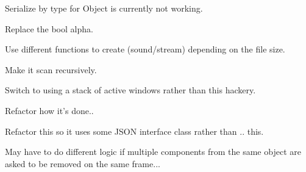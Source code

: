 \begin{DoxyRefList}
\item[\label{todo__todo000007}%
\hypertarget{todo__todo000007}{}%
Member \hyperlink{classDCEngine_1_1Object_a77d4c41334c102e53196d3a6d7cf7215}{D\-C\-Engine\-:\-:Object\-:\-:Serialize} (Zilch\-::\-Json\-Builder \&builder)]Serialize by type for Object is currently not working.  
\item[\label{todo__todo000011}%
\hypertarget{todo__todo000011}{}%
Member \hyperlink{classDCEngine_1_1SpriteSource_ab6e4b6ab4e014b9fe0b5c7e29a4297d1}{D\-C\-Engine\-:\-:Sprite\-Source\-:\-:Load\-Texture} ()]Replace the bool alpha.  
\item[\label{todo__todo000015}%
\hypertarget{todo__todo000015}{}%
Member \hyperlink{classDCEngine_1_1Systems_1_1Audio_a91b9a87f44307937d5f7a597456e1e96}{D\-C\-Engine\-:\-:Systems\-:\-:Audio\-:\-:Create\-Sound} (std\-::string \&sound\-File, F\-M\-O\-D\-Sound\-Handle \&sound\-Ptr)]Use different functions to create (sound/stream) depending on the file size.  
\item[\label{todo__todo000018}%
\hypertarget{todo__todo000018}{}%
Member \hyperlink{classDCEngine_1_1Systems_1_1Content_a12d79aa3afbd0ee1d48bcc885de355b7}{D\-C\-Engine\-:\-:Systems\-:\-:Content\-:\-:Scan\-And\-Generate\-Resources} ()]Make it scan recursively.  
\item[\label{todo__todo000019}%
\hypertarget{todo__todo000019}{}%
Member \hyperlink{classDCEngine_1_1Systems_1_1Editor_a4d530af60faddb7e243bcdd21e58d973}{D\-C\-Engine\-:\-:Systems\-:\-:Editor\-:\-:Toggle\-Test} ()]Switch to using a stack of active windows rather than this hackery.  
\item[\label{todo__todo000035}%
\hypertarget{todo__todo000035}{}%
Member \hyperlink{classDCEngine_1_1Systems_1_1Factory_af6ded32c3d92e2cfa32dc7511df268da}{D\-C\-Engine\-:\-:Systems\-:\-:Factory\-:\-:Build\-Game\-Object} (Serialized\-Member $\ast$object\-Data, Space \&space)]Refactor how it's done..  
\item[\label{todo__todo000034}%
\hypertarget{todo__todo000034}{}%
Member \hyperlink{classDCEngine_1_1Systems_1_1Factory_a3cc34e680424f1982f719da99282765b}{D\-C\-Engine\-:\-:Systems\-:\-:Factory\-:\-:Create\-Game\-Object} (Archetype\-Ptr archetype, Space \&space, bool init)]Refactor this so it uses some J\-S\-O\-N interface class rather than .. this.  
\item[\label{todo__todo000036}%
\hypertarget{todo__todo000036}{}%
Member \hyperlink{classDCEngine_1_1Systems_1_1Factory_a776cd6cdc54459b710a07d16acd9872f}{D\-C\-Engine\-:\-:Systems\-:\-:Factory\-:\-:Destroy\-Components} ()]May have to do different logic if multiple components from the same object are asked to be removed on the same frame...  

\end{DoxyRefList}
